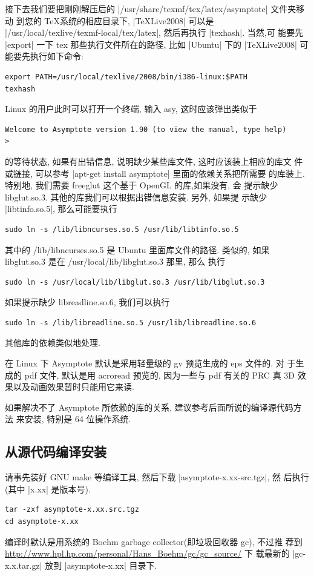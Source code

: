 \documentclass{ctexbook}
\begin{document}
接下去我们要把刚刚解压后的 |/usr/share/texmf/tex/latex/asymptote| 文件夹移动
到您的 \TeX 系统的相应目录下, |TeXLive2008| 可以是
|/usr/local/texlive/texmf-local/tex/latex|, 然后再执行 |texhash|. 当然,可
能要先 |export| 一下 tex 那些执行文件所在的路径, 比如 |Ubuntu| 下的
|TeXLive2008| 可能要先执行如下命令:
\begin{verbatim}
export PATH=/usr/local/texlive/2008/bin/i386-linux:$PATH
texhash
\end{verbatim}
Linux 的用户此时可以打开一个终端, 输入 asy, 这时应该弹出类似于
\begin{verbatim}
Welcome to Asymptote version 1.90 (to view the manual, type help)
>
\end{verbatim}
的等待状态, 如果有出错信息, 说明缺少某些库文件, 这时应该装上相应的库文
件或链接, 可以参考 |apt-get install asymptote| 里面的依赖关系把所需要
的库装上. 特别地, 我们需要 freeglut 这个基于 OpenGL 的库,如果没有, 会
提示缺少 libglut.so.3. 其他的库我们可以根据出错信息安装. 另外, 如果提
示缺少 |libtinfo.so.5|, 那么可能要执行
\begin{verbatim}
sudo ln -s /lib/libncurses.so.5 /usr/lib/libtinfo.so.5
\end{verbatim}
其中的 /lib/libncurses.so.5 是 Ubuntu 里面库文件的路径.
类似的, 如果 libglut.so.3 是在 /usr/local/lib/libglut.so.3 那里, 那么
执行
\begin{verbatim}
sudo ln -s /usr/local/lib/libglut.so.3 /usr/lib/libglut.so.3
\end{verbatim}
如果提示缺少 libreadline.so.6, 我们可以执行
\begin{verbatim}
sudo ln -s /lib/libreadline.so.5 /usr/lib/libreadline.so.6
\end{verbatim}
其他库的依赖类似地处理.

在 Linux 下 Asymptote 默认是采用轻量级的 gv 预览生成的 eps 文件的. 对
于生成的 pdf 文件, 默认是用 acroread 预览的, 因为一些与 pdf 有关的 PRC
真 3D 效果以及动画效果暂时只能用它来读.

如果解决不了 Asymptote 所依赖的库的关系, 建议参考后面所说的编译源代码方法
来安装, 特别是 64 位操作系统.

\subsection{从源代码编译安装}
请事先装好 GNU make 等编译工具, 然后下载 |asymptote-x.xx-src.tgz|, 然
后执行(其中 |x.xx| 是版本号).
\begin{verbatim}
tar -zxf asymptote-x.xx.src.tgz
cd asymptote-x.xx
\end{verbatim}
编译时默认是用系统的 Boehm garbage collector(即垃圾回收器 gc), 不过推
荐到 \url{http://www.hpl.hp.com/personal/Hans_Boehm/gc/gc_source/} 下
载最新的 |gc-x.x.tar.gz| 放到 |asymptote-x.xx| 目录下.
\end{document}
